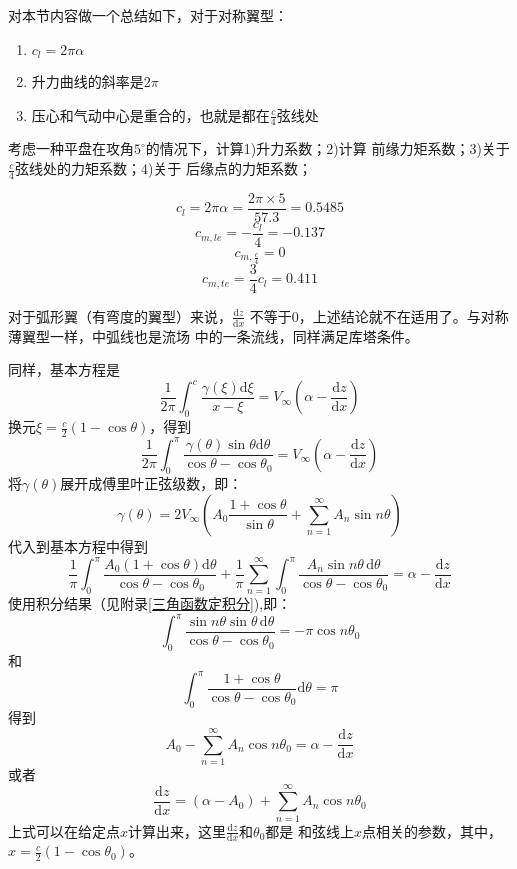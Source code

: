 对本节内容做一个总结如下，对于对称翼型：
\begin{enumerate}
  \item $c_l=2\pi \alpha$ 
  \item 升力曲线的斜率是$2\pi$
  \item 压心和气动中心是重合的，也就是都在$\frac{c}{4}$弦线处
\end{enumerate}
\begin{example}
  考虑一种平盘在攻角$5^\circ$的情况下，计算1)升力系数；2)计算
  前缘力矩系数；3)关于$\frac{c}{4}$弦线处的力矩系数；4)关于
  后缘点的力矩系数；

  \[
    c_l=2 \pi \alpha=\frac{2\pi\times 5}{57.3}=0.5485
  \]
\[
c_{m,le}=- \frac{c_l}{4}=-0.137
\]
\[
  c_{m,\frac{c}{4}}=0
\]
\[
  c_{m,te}=\frac{3}{4}c_l=0.411
\]
\end{example}

对于弧形翼（有弯度的翼型）来说，$\frac{\mathrm{d}z }{\mathrm{d}x}$
不等于0，上述结论就不在适用了。与对称薄翼型一样，中弧线也是流场
中的一条流线，同样满足库塔条件。

同样，基本方程是
\[
  \frac{1}{2\pi}\int _0^c \frac{\gamma(\xi)\mathrm{d}\xi}{x-\xi}=V_\infty (\alpha-\frac{\mathrm{d}z }{\mathrm{d}x})
\]
换元$\xi=\frac{c}{2 }(1-\cos \theta)$，得到
\[
  \frac{1}{2\pi}\int _0^\pi \frac{\gamma(\theta)\sin \theta\mathrm{d}\theta}{\cos \theta -\cos \theta_0}
  =V_\infty \left(\alpha-\frac{\mathrm{d}z }{\mathrm{d}x}\right)
\]
将$\gamma(\theta)$展开成傅里叶正弦级数，即：
\[
  \gamma(\theta)=2V_\infty\left(A_0 \frac{1+\cos \theta}{\sin \theta}+
\sum _{n=1}^\infty A_n \sin n \theta\right)
\]
代入到基本方程中得到
\[
  \frac{1}{\pi}\int _0^\pi \frac{A_0\left(1+\cos \theta\right)\mathrm{d}\theta}{\cos \theta-\cos \theta_0}+
  \frac{1}{\pi}\sum_{n=1}^\infty \int _0^\pi \frac{A_n \sin n \theta \, \mathrm{d}\theta}{\cos \theta-\cos \theta_0}
  =\alpha -\frac{\mathrm{d}z }{\mathrm{d}x}
\]
使用积分结果（见{\color{titleblue}附录\ref{三角函数定积分}}),即：
\[
  \int_0^\pi \frac{\sin n \theta \sin \theta \, \mathrm{d}\theta}{\cos \theta -\cos \theta_0}
  =-\pi \cos n \theta_0
\]
和
\[
  \int _0^\pi \frac{1+\cos \theta}{\cos \theta -\cos \theta_0}\mathrm{d} \theta =\pi
\]
得到
\[
  A_0-\sum _{n=1}^\infty A_n \cos n \theta_0 =\alpha -\frac{\mathrm{d}z }{\mathrm{d} x}
\]
或者
\[
  \frac{\mathrm{d} z }{\mathrm{d}x }=\left(\alpha-A_0\right)+\sum_{n=1}^\infty A_n \cos n \theta_0
\]
上式可以在给定点$x$计算出来，这里$\frac{\mathrm{d}z }{\mathrm{d}x }$和$\theta_0$都是
和弦线上$x$点相关的参数，其中，$x=\frac{c}{2 }(1-\cos \theta_0)$。

